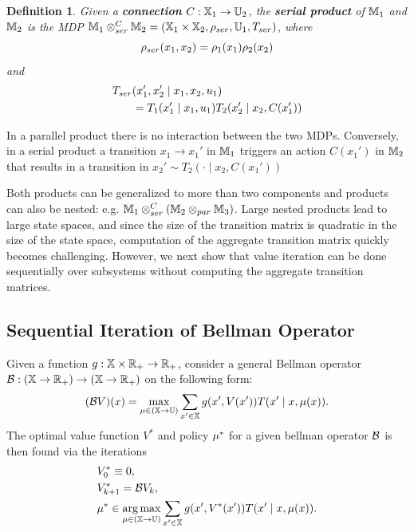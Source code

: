 \documentclass[conference]{IEEEtran}
\newtheorem{definition}{Definition}
\begin{document}
\begin{definition}
  Given a \textbf{connection} $C : \mathbb{X}_1 \rightarrow \mathbb{U}_2$, the \textbf{serial product} of $\mathbb{M}_1$ and $\mathbb{M}_2$ is the MDP $\mathbb{M}_1 \otimes_{ser}^C \mathbb{M}_2 = (\mathbb{X}_1 \times \mathbb{X}_2, \rho_{ser}, \mathbb{U}_1, T_{ser})$,
  where
  \begin{equation}
    \rho_{ser}(x_1, x_2) = \rho_1(x_1) \rho_2(x_2)
  \end{equation}
  and
  \begin{equation}
  \begin{aligned}
      T_{ser}&(x_1', x_2' \mid x_1, x_2, u_1) \\
      & = T_1 (x_1' \mid x_1, u_1) T_2 (x_2' \mid x_2, C(x_1') )
  \end{aligned}
  \end{equation}
\end{definition}
In a parallel product there is no interaction between the two MDPs. Conversely, in a serial product a transition $x_1 \rightarrow x_1'$ in $\mathbb{M}_1$ triggers an action $C(x_1')$ in $\mathbb{M}_2$ that results in a transition in $x_2' \sim T_2(\cdot \mid x_2, C(x_1'))$

Both products can be generalized to more than two components and products can also be nested: e.g. $\mathbb{M}_1 \otimes_{ser}^C \left( \mathbb{M}_2 \otimes_{par} \mathbb{M}_3 \right)$. Large nested products lead to large state spaces, and since the size of the transition matrix is quadratic in the size of the state space, computation of the aggregate transition matrix quickly becomes challenging. However, we next show that value iteration can be done sequentially over subsystems without computing the aggregate transition matrices.


\subsection{Sequential Iteration of Bellman Operator}

Given a function $g: \mathbb{X} \times \mathbb{R}_+ \rightarrow \mathbb{R}_+$, consider a general Bellman operator $\mathcal{B} : (\mathbb{X} \rightarrow \mathbb{R}_+) \rightarrow (\mathbb{X} \rightarrow \mathbb{R}_+)$ on the following form:
\begin{equation}
  (\mathcal{B} V) (x) = \max_{\mu \in (\mathbb{X} \rightarrow \mathbb{U})} \sum_{x' \in \mathbb{X}}  g(x', V(x')) T(x' \mid x, \mu(x)).
\end{equation}
The optimal value function $V^*$ and policy $\mu^*$ for a given bellman operator $\mathcal{B}$ is then found via the iterations
\begin{subequations}
\label{eq:value_iter}
  \begin{align}
    & V^*_0 \equiv 0, \\
    & V^*_{k+1}  = \bellman V_k \label{eq:iter}, \\
    & \pol^* \in \argmax_{\pol \in (\X \rightarrow \U)} \sum_{x' \in \X}  g(x', V^*(x')) T(x' \mid x, \pol(x)).
  \end{align}
\end{subequations}
\end{document}
